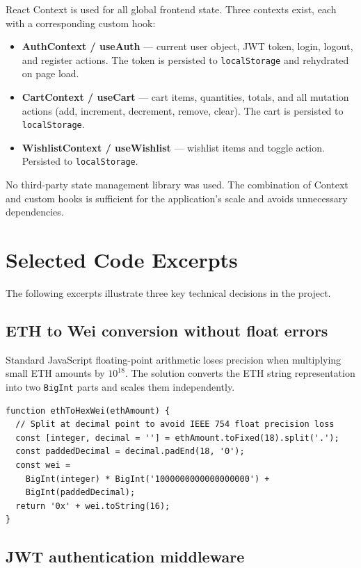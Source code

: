 \documentclass[11pt, a4paper]{report}
\begin{document}
React Context is used for all global frontend state. Three contexts exist, each with a corresponding custom hook:

\begin{itemize}
  \item \textbf{AuthContext / useAuth} — current user object, JWT token, login, logout, and register actions. The token is persisted to \texttt{localStorage} and rehydrated on page load.
  \item \textbf{CartContext / useCart} — cart items, quantities, totals, and all mutation actions (add, increment, decrement, remove, clear). The cart is persisted to \texttt{localStorage}.
  \item \textbf{WishlistContext / useWishlist} — wishlist items and toggle action. Persisted to \texttt{localStorage}.
\end{itemize}

No third-party state management library was used. The combination of Context and custom hooks is sufficient for the application's scale and avoids unnecessary dependencies.

\section{Selected Code Excerpts}

The following excerpts illustrate three key technical decisions in the project.

\subsection*{ETH to Wei conversion without float errors}

Standard JavaScript floating-point arithmetic loses precision when multiplying small ETH amounts by $10^{18}$. The solution converts the ETH string representation into two \texttt{BigInt} parts and scales them independently.

\begin{lstlisting}[caption={client/src/pages/PaymentPage.jsx — ethToHexWei()}]
function ethToHexWei(ethAmount) {
  // Split at decimal point to avoid IEEE 754 float precision loss
  const [integer, decimal = ''] = ethAmount.toFixed(18).split('.');
  const paddedDecimal = decimal.padEnd(18, '0');
  const wei =
    BigInt(integer) * BigInt('1000000000000000000') +
    BigInt(paddedDecimal);
  return '0x' + wei.toString(16);
}
\end{lstlisting}

\subsection*{JWT authentication middleware}
\end{document}
